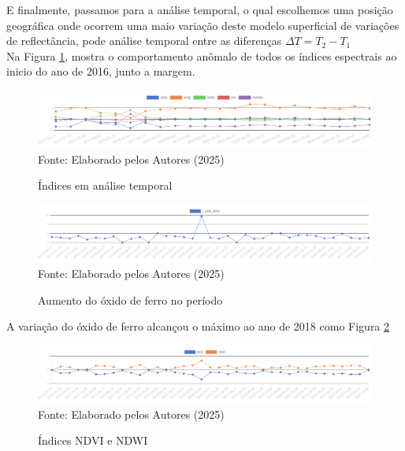 \hspace*{1.25 cm} E finalmente, passamos para a análise temporal, o qual escolhemos uma posição geográfica onde ocorrem uma maio variação deste modelo superficial de variações de reflectância, pode análise temporal entre as diferenças  \( \Delta T = T_{2}  - T_{1} \)\\
%
\hspace*{1.25 cm}  Na Figura \ref{fig:INDICES}, mostra o comportamento anômalo de todos os índices espectrais ao inicio do ano de 2016, junto a margem.\\

 \begin{figure}[H]
	\centering  \small \caption{Índices em  análise temporal}
	\includegraphics[width=0.97\linewidth]{FIGURAS/indices}
	\label{fig:INDICES}{ Fonte:   Elaborado pelos Autores (2025)}
\end{figure}

 \begin{figure}[H]
	\centering  \small \caption{Aumento do óxido de ferro no período}
	\includegraphics[width=0.97\linewidth]{FIGURAS/graphvisualiser-1747928533564}
	\label{fig:INDICES2}{ Fonte:   Elaborado pelos Autores (2025)}
\end{figure}

\hspace*{1.25 cm} A variação do óxido de ferro alcançou o máximo ao ano de 2018 como Figura \ref{fig:INDICES2}\\
%
\begin{figure}[H]
	\centering  \small \caption{Índices NDVI e NDWI}
	\includegraphics[width=0.97\linewidth]{FIGURAS/graphvisualiser-1747928457345}
	\label{fig:INDICES3}{ Fonte:   Elaborado pelos Autores (2025)}
\end{figure}



